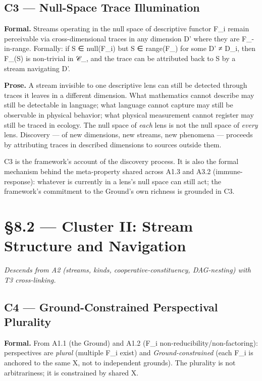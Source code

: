 \documentclass[11pt, openany]{book}
\newcommand{\sectionbreak}{\clearpage}
\begin{document}
\subsection{C3 --- Null-Space Trace Illumination}

\textbf{Formal.} Streams operating in the null space of descriptive functor F\_\allowbreak{}i remain perceivable via cross-dimensional traces in any dimension D' where they are F\_-in-range. Formally: if S ∈ null(F\_\allowbreak{}i) but S ∈ range(F\_) for some D' ≠ D\_\allowbreak{}i, then F\_(S) is non-trivial in 𝒞\_, and the trace can be attributed back to S by a stream navigating D'.

\textbf{Prose.} A stream invisible to one descriptive lens can still be detected through traces it leaves in a different dimension. What mathematics cannot describe may still be detectable in language; what language cannot capture may still be observable in physical behavior; what physical measurement cannot register may still be traced in ecology. The null space of \textit{each} lens is not the null space of \textit{every} lens. Discovery --- of new dimensions, new streams, new phenomena --- proceeds by attributing traces in described dimensions to sources outside them.

C3 is the framework's account of the discovery process. It is also the formal mechanism behind the meta-property shared across A1.3 and A3.2 (immune-response): whatever is currently in a lens's null space can still act; the framework's commitment to the Ground's own richness is grounded in C3.

\sectionbreak

\section{§8.2 --- Cluster II: Stream Structure and Navigation}

\textit{Descends from A2 (streams, kinds, cooperative-constituency, DAG-nesting) with T3 cross-linking.}

\subsection{C4 --- Ground-Constrained Perspectival Plurality}

\textbf{Formal.} From A1.1 (the Ground) and A1.2 (F\_\allowbreak{}i non-reducibility/non-factoring): perspectives are \textit{plural} (multiple F\_\allowbreak{}i exist) and \textit{Ground-constrained} (each F\_\allowbreak{}i is anchored to the same X, not to independent grounds). The plurality is not arbitrariness; it is constrained by shared X.
\end{document}
